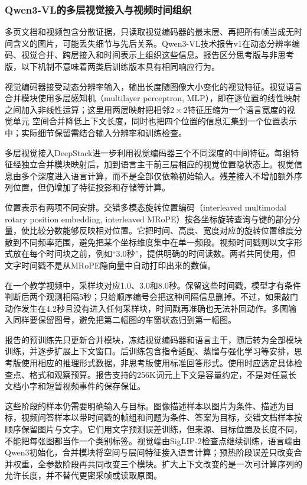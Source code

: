 \subsubsection{Qwen3-VL的多层视觉接入与视频时间组织}
\label{sec:vision-models-qwen3vl}

多页文档和视频包含分散证据，只读取视觉编码器的最末层、再把所有帧当成无时间含义的图片，可能丢失细节与先后关系。Qwen3-VL技术报告v1在动态分辨率编码、视觉合并、跨层接入和时间表示上组织这些信息。报告区分思考版与非思考版，以下机制不意味着两类后训练版本具有相同响应行为。

视觉编码器接受动态分辨率输入，输出长度随图像大小变化的视觉特征。视觉语言合并模块使用多层感知机（multilayer perceptron, MLP），即在逐位置的线性映射之间加入非线性运算；这里用两层映射把相邻$2\times2$特征压缩为一个语言宽度的视觉单元
空间合并降低上下文长度，同时也把四个位置的信息汇集到一个位置表示中；实际细节保留需结合输入分辨率和训练检查。

多层视觉接入DeepStack进一步利用视觉编码器三个不同深度的中间特征。每组特征经独立合并模块映射后，加到语言主干前三层相应的视觉位置隐状态上。视觉信息由多个深度进入语言计算，而不是全部仅依赖初始输入。残差接入不增加额外序列位置，但仍增加了特征投影和存储等计算。

位置表示有两项不同安排。交错多模态旋转位置编码（interleaved multimodal rotary position embedding, interleaved MRoPE）按各坐标旋转查询与键的部分分量，使比较分数能够反映相对位置。它把时间、高度、宽度对应的旋转位置维度分散到不同频率范围，避免把某个坐标维度集中在单一频段。视频时间戳则以文字形式放在每个时间块之前，例如“3.0秒”，提供明确的时间读数。两者共同使用，但文字时间戳不是从MRoPE隐向量中自动打印出来的数值。

在一个教学视频中，采样块对应1.0、3.0和8.0秒。保留这些时间戳，模型才有条件判断后两个观测相隔5秒；只给顺序编号会把这种间隔信息删掉。不过，如果敲门动作发生在4.2秒且没有进入任何采样块，时间戳再准确也无法补回动作。多图输入同样要保留图号，避免把第二幅图的车窗状态归到第一幅图。

报告的预训练先只更新合并模块，冻结视觉编码器和语言主干，随后转为全部模块训练，并逐步扩展上下文窗口。后训练包含指令适配、蒸馏与强化学习等安排，思考版使用相应的推理形式数据，非思考版使用标准回答形式。使用时应选定具体检查点、格式和观察预算。报告支持的256K词元上下文是容量约定，不是对任意长文档小字和短暂视频事件的保存保证。

这些阶段的样本仍需要明确输入与目标。图像描述样本以图片为条件、描述为目标，视频问答样本以带时间戳的帧组和问题为条件、答案为目标，交错文档样本按顺序保留图片与文字。它们用文字预测误差训练，但来源、目标位置及长度不同，不能把每张图都当作一个类别标签。视觉端由SigLIP-2检查点继续训练，语言端由Qwen3初始化，合并模块将空间与层间特征接入语言计算；预热阶段误差只改变合并权重，全参数阶段再共同改变三个模块。扩大上下文改变的是一次可计算序列的允许长度，并不替代更密采帧或读取原图。


